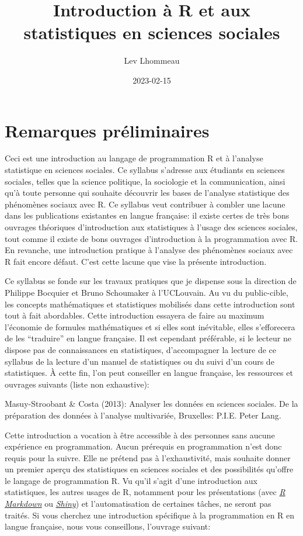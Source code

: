 \documentclass[
]{book}
\title{Introduction à R et aux statistiques en sciences sociales}
\author{Lev Lhommeau}
\date{2023-02-15}
\begin{document}
\maketitle

{
\setcounter{tocdepth}{1}
\tableofcontents
}
\hypertarget{remarques-pruxe9liminaires}{%
\chapter{Remarques préliminaires}\label{remarques-pruxe9liminaires}}

Ceci est une introduction au langage de programmation R et à l'analyse statistique en sciences sociales. Ce syllabus s'adresse aux étudiants en sciences sociales, telles que la science politique, la sociologie et la communication, ainsi qu'à toute personne qui souhaite découvrir les bases de l'analyse statistique des phénomènes sociaux avec R. Ce syllabus veut contribuer à combler une lacune dans les publications existantes en langue française: il existe certes de très bons ouvrages théoriques d'introduction aux statistiques à l'usage des sciences sociales, tout comme il existe de bons ouvrages d'introduction à la programmation avec R. En revanche, une introduction pratique à l'analyse des phénomènes sociaux avec R fait encore défaut. C'est cette lacune que vise la présente introduction.

Ce syllabus se fonde sur les travaux pratiques que je dispense sous la direction de Philippe Bocquier et Bruno Schoumaker à l'UCLouvain. Au vu du public-cible, les concepts mathématiques et statistiques mobilisés dans cette introduction sont tout à fait abordables. Cette introduction essayera de faire au maximum l'économie de formules mathématiques et si elles sont inévitable, elles s'efforecera de les ``traduire'' en langue française. Il est cependant préférable, si le lecteur ne dispose pas de connaissances en statistiques, d'accompagner la lecture de ce syllabus de la lecture d'un manuel de statistiques ou du suivi d'un cours de statistiques. À cette fin, l'on peut conseiller en langue française, les ressources et ouvrages suivants (liste non exhaustive):

Masuy-Stroobant \& Costa (2013): Analyser les données en sciences sociales. De la préparation des données à l'analyse multivariée, Bruxelles: P.I.E. Peter Lang.

Cette introduction a vocation à être accessible à des personnes sans aucune expérience en programmation. Aucun prérequis en programmation n'est donc requis pour la suivre. Elle ne prétend pas à l'exhaustivité, mais souhaite donner un premier aperçu des statistiques en sciences sociales et des possibilités qu'offre le langage de programmation R. Vu qu'il s'agit d'une introduction aux statistiques, les autres usages de R, notamment pour les présentations (avec \href{https://rmarkdown.rstudio.com/}{\emph{R Markdown}} ou \href{https://shiny.rstudio.com/}{\emph{Shiny}}) et l'automatisation de certaines tâches, ne seront pas traités. Si vous cherchez une introduction spécifique à la programmation en R en langue française, nous vous conseillons, l'ouvrage suivant:
\end{document}
